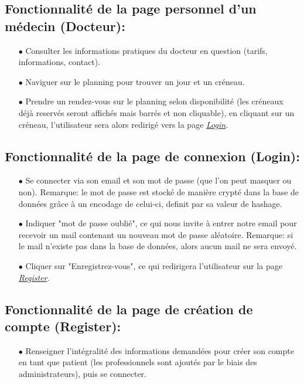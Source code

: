 \documentclass[a4paper]{report}
\begin{document}
\subsection{Fonctionnalité de la page personnel d'un médecin (Docteur):}\label{docteur}
    \begin{itemize}
        \item[$\bullet$] Consulter les informations pratiques du docteur en question (tarifs, informations, contact).
        \item[$\bullet$] Naviguer sur le planning pour trouver un jour et un créneau.
        \item[$\bullet$] Prendre un rendez-vous sur le planning selon disponibilité (les créneaux déjà reservés seront affichés mais barrés et non cliquable), en cliquant sur un créneau, l’utilisateur sera alors redirigé vers la page \textit{\hyperref[login]{Login}}.
    \end{itemize}
    \vspace{3mm}

\subsection{Fonctionnalité de la page de connexion (Login):}\label{login}
    \begin{itemize}
        \item[$\bullet$] Se connecter via son email et son mot de passe (que l’on peut masquer ou non). {\fontsize{8}{14}\selectfont Remarque: le mot de passe est stocké de manière crypté dans la base de données grâce à un encodage de celui-ci, definit par sa valeur de hashage.}
        \item[$\bullet$] Indiquer "mot de passe oublié", ce qui nous invite à entrer notre email pour recevoir un mail contenant un nouveau mot de passe aléatoire. {\fontsize{8}{14}\selectfont Remarque: si le mail n'existe pas dans la base de données, alors aucun mail ne sera envoyé.}
        \item[$\bullet$] Cliquer sur "Enregistrez-vous", ce qui redirigera l'utilisateur sur la page \textit{\hyperref[register]{Register}}.
    \end{itemize}
    \vspace{3mm}

\subsection{Fonctionnalité de la page de création de compte (Register):}\label{register}
    \begin{itemize}
        \item[$\bullet$] Renseigner l'intégralité des informations demandées pour créer son compte en tant que patient (les professionnels sont ajoutés par le biais des administrateurs), puis se connecter.
    \end{itemize}
\end{document}
